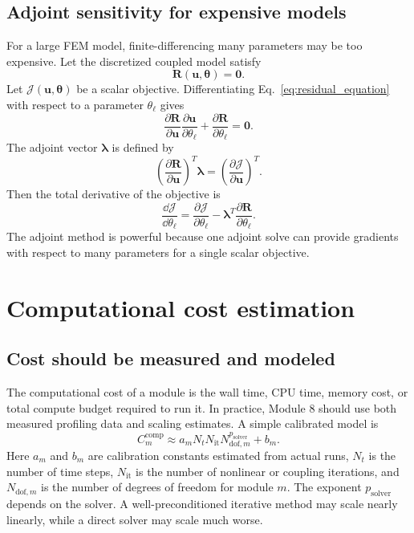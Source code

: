 \documentclass[11pt]{article}
\begin{document}
\subsection{Adjoint sensitivity for expensive models}
For a large FEM model, finite-differencing many parameters may be too expensive. Let the discretized coupled model satisfy
\begin{equation}
    \bm{R}(\bm{u},\bm{\theta})=\bm{0}.
    \label{eq:residual_equation}
\end{equation}
Let \(\mathcal{J}(\bm{u},\bm{\theta})\) be a scalar objective. Differentiating Eq.~\eqref{eq:residual_equation} with respect to a parameter \(\theta_\ell\) gives
\begin{equation}
    \frac{\partial \bm{R}}{\partial \bm{u}}
    \frac{\partial \bm{u}}{\partial \theta_\ell}
    +
    \frac{\partial \bm{R}}{\partial \theta_\ell}
    =
    \bm{0}.
    \label{eq:direct_sensitivity_residual}
\end{equation}
The adjoint vector \(\bm{\lambda}\) is defined by
\begin{equation}
    \left(\frac{\partial \bm{R}}{\partial \bm{u}}\right)^T
    \bm{\lambda}
    =
    \left(\frac{\partial \mathcal{J}}{\partial \bm{u}}\right)^T.
    \label{eq:adjoint_equation}
\end{equation}
Then the total derivative of the objective is
\begin{equation}
    \boxed{
    \frac{\dd \mathcal{J}}{\dd \theta_\ell}
    =
    \frac{\partial \mathcal{J}}{\partial \theta_\ell}
    -
    \bm{\lambda}^T
    \frac{\partial \bm{R}}{\partial \theta_\ell}.
    }
    \label{eq:adjoint_gradient}
\end{equation}
The adjoint method is powerful because one adjoint solve can provide gradients with respect to many parameters for a single scalar objective.

\section{Computational cost estimation}
\subsection{Cost should be measured and modeled}
The computational cost of a module is the wall time, CPU time, memory cost, or total compute budget required to run it. In practice, Module 8 should use both measured profiling data and scaling estimates. A simple calibrated model is
\begin{equation}
    \boxed{
    C_m^{\mathrm{comp}}
    \approx
    a_m
    N_t
    N_{\mathrm{it}}
    N_{\mathrm{dof},m}^{p_{\mathrm{solver}}}
    +
    b_m.
    }
    \label{eq:pde_cost_model}
\end{equation}
Here \(a_m\) and \(b_m\) are calibration constants estimated from actual runs, \(N_t\) is the number of time steps, \(N_{\mathrm{it}}\) is the number of nonlinear or coupling iterations, and \(N_{\mathrm{dof},m}\) is the number of degrees of freedom for module \(m\). The exponent \(p_{\mathrm{solver}}\) depends on the solver. A well-preconditioned iterative method may scale nearly linearly, while a direct solver may scale much worse.
\end{document}
